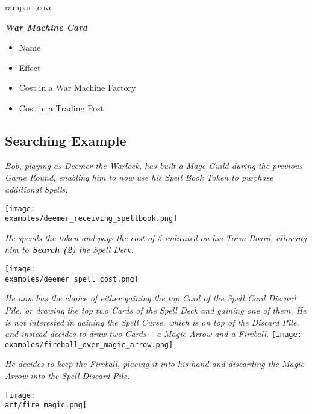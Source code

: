 \begin{multicols*}{2}
\begin{expansion}{rampart,cove}
{    \footnotesize
    \textbf{\textit{\textcolor{darkcandyapplered}{War Machine Card}}}
    \begin{itemize}[itemsep=0pt, parsep=5pt, topsep=0pt, partopsep=0pt]
      \item[\textbf{1.}] Name
      \item[\textbf{2.}] Effect
      \item[\textbf{3.}] Cost in a War Machine Factory
      \item[\textbf{4.}] Cost in a Trading Post
    \end{itemize}
  }
\end{expansion}

\vspace*{\fill}

\subsection*{Searching Example}

\textit{Bob, playing as Deemer the Warlock, has built a Mage Guild during the previous Game Round, enabling him to now use his Spell Book Token to purchase additional Spells.}

\texttt{[image: \\examples/deemer\_receiving\_spellbook.png]}\par
\textit{He spends the token and pays the cost of 5  indicated on his Town Board, allowing him to \textbf{Search (2)} the Spell Deck.}\par
\texttt{[image: \\examples/deemer\_spell\_cost.png]}\par
\filbreak
\textit{He now has the choice of either gaining the top Card of the Spell Card Discard Pile, or drawing the top two Cards of the Spell Deck and gaining one of them.
He is not interested in gaining the Spell Curse, which is on top of the Discard Pile, and instead decides to draw two Cards – a Magic Arrow and a Fireball.}
\texttt{[image: \\examples/fireball\_over\_magic\_arrow.png]}\par
\textit{He decides to keep the Fireball, placing it into his hand and discarding the Magic Arrow into the Spell Discard Pile.}

\vspace*{\fill}

\hfill{\texttt{[image: \\art/fire\_magic.png]}}

\end{multicols*}

